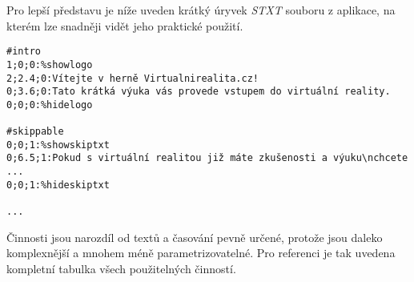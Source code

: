 Pro lepší představu je níže uveden krátký úryvek \emph{STXT} souboru z
aplikace, na kterém lze snadněji vidět jeho praktické použití.

\begin{verbatim}
#intro
1;0;0:%showlogo
2;2.4;0:Vítejte v herně Virtualnirealita.cz!
0;3.6;0:Tato krátká výuka vás provede vstupem do virtuální reality.
0;0;0:%hidelogo

#skippable
0;0;1:%showskiptxt
0;6.5;1:Pokud s virtuální realitou již máte zkušenosti a výuku\nchcete ...
0;0;1:%hideskiptxt

...
\end{verbatim}

Činnosti jsou narozdíl od textů a časování pevně určené, protože jsou
daleko komplexnější a mnohem méně parametrizovatelné. Pro referenci je
tak uvedena kompletní tabulka všech použitelných činností.

